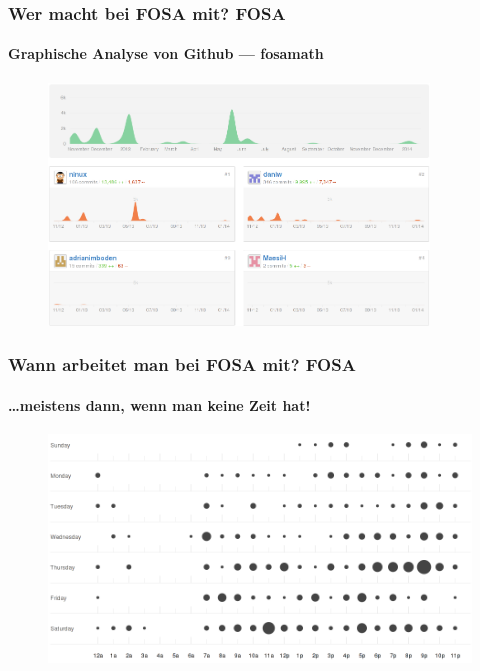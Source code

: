 \begin{frame}
	\frametitle{Wer macht bei FOSA mit? \hfill{} \footnotesize{FOSA}}
	\framesubtitle{Graphische Analyse von Github --- fosamath}
	\begin{figure}
		\centering
		\includegraphics[width=0.9\textwidth]{fig/fosamath-additions.png}
	\end{figure}
\end{frame}

\begin{frame}
	\frametitle{Wann arbeitet man bei FOSA mit? \hfill{} \footnotesize{FOSA}}
	\framesubtitle{\dots meistens dann, wenn man keine Zeit hat!}
	\begin{figure}
		\centering
		\includegraphics[width=1\textwidth]{fig/fosamath-punchcard.png}
	\end{figure}
\end{frame}

